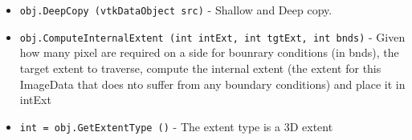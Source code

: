 \begin{itemize}
\item  \verb|obj.DeepCopy (vtkDataObject src)| -  Shallow and Deep copy.

\item  \verb|obj.ComputeInternalExtent (int intExt, int tgtExt, int bnds)| -  Given how many pixel are required on a side for bounrary conditions (in
 bnds), the target extent to traverse, compute the internal extent (the
 extent for this ImageData that does nto suffer from any boundary
 conditions) and place it in intExt

\item  \verb|int = obj.GetExtentType ()| -  The extent type is a 3D extent

\end{itemize}
